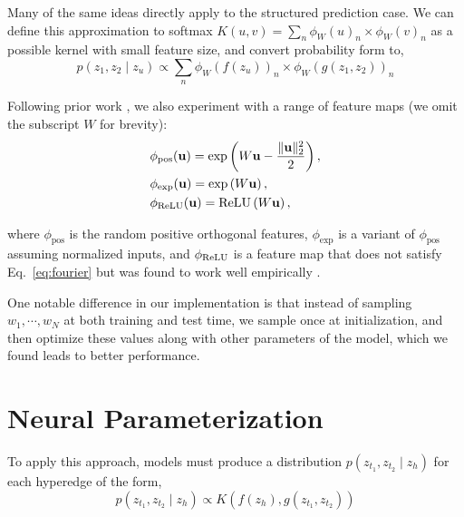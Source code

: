 \documentclass{article}
\begin{document}





Many of the same ideas directly apply to the structured prediction case. We can define this approximation to softmax $K(u, v) = \sum_n \phi_W(u)_n \times \phi_W(v)_n$ as a possible kernel with small feature size, and  convert probability form to, 
\[ p(z_1, z_2 \mid z_{u}) \propto \sum_n \phi_W(f(z_u))_n \times \phi_W(g(z_1,z_2))_n \]

Following prior work \citep{choromanski2020performer}, we also experiment with a range of feature maps (we omit the subscript $W$ for brevity):
\begin{align*}
&\phi_{\textrm{pos}}(\mathbf{u}) = \exp\left(W\mathbf{u} - \frac{\|\mathbf{u}\|_2^2}{2}\right),\\
&\phi_{\exp} (\mathbf{u}) = \exp\left(W\mathbf{u}\right),\\
&\phi_{\mathrm{ReLU}}(\mathbf{u}) = \mathrm{ReLU}\left(W\mathbf{u}\right),
\end{align*}

where $\phi_{\textrm{pos}}$ is the random positive orthogonal features, $\phi_{\exp}$ is a variant of $\phi_{\textrm{pos}}$ assuming normalized inputs, and $\phi_{\mathrm{ReLU}}$ is a feature map that does not satisfy Eq.~\ref{eq:fourier} but was found to work well empirically \citep{choromanski2020performer}.

One notable difference in our implementation is that instead of sampling $w_1,\cdots, w_N$ at both training and test time, we sample once at initialization, and then optimize these values along with other parameters of the model, which we found leads to better performance. 

\section{Neural Parameterization}


To apply this approach, models must produce a distribution $p(z_{t_1}, z_{t_2} \mid z_h)$ for each 
hyperedge of the form,
\[ p(z_{t_1}, z_{t_2} \mid z_h) \propto K(f(z_h), g(z_{t_1}, z_{t_2}))\] 
\end{document}
